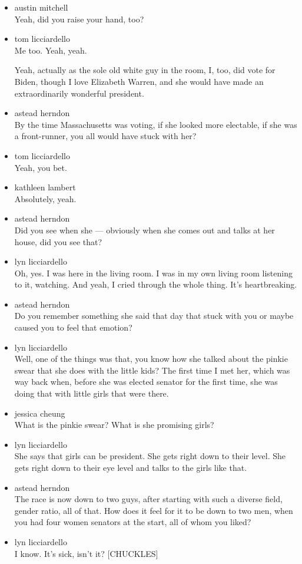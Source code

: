 \begin{itemize}
\item
  austin mitchell\\
  Yeah, did you raise your hand, too?
\item
  tom licciardello\\
  Me too. Yeah, yeah.

  Yeah, actually as the sole old white guy in the room, I, too, did vote
  for Biden, though I love Elizabeth Warren, and she would have made an
  extraordinarily wonderful president.
\item
  astead herndon\\
  By the time Massachusetts was voting, if she looked more electable, if
  she was a front-runner, you all would have stuck with her?
\item
  tom licciardello\\
  Yeah, you bet.
\item
  kathleen lambert\\
  Absolutely, yeah.
\item
  astead herndon\\
  Did you see when she --- obviously when she comes out and talks at her
  house, did you see that?
\item
  lyn licciardello\\
  Oh, yes. I was here in the living room. I was in my own living room
  listening to it, watching. And yeah, I cried through the whole thing.
  It's heartbreaking.
\item
  astead herndon\\
  Do you remember something she said that day that stuck with you or
  maybe caused you to feel that emotion?
\item
  lyn licciardello\\
  Well, one of the things was that, you know how she talked about the
  pinkie swear that she does with the little kids? The first time I met
  her, which was way back when, before she was elected senator for the
  first time, she was doing that with little girls that were there.
\item
  jessica cheung\\
  What is the pinkie swear? What is she promising girls?
\item
  lyn licciardello\\
  She says that girls can be president. She gets right down to their
  level. She gets right down to their eye level and talks to the girls
  like that.
\item
  astead herndon\\
  The race is now down to two guys, after starting with such a diverse
  field, gender ratio, all of that. How does it feel for it to be down
  to two men, when you had four women senators at the start, all of whom
  you liked?
\item
  lyn licciardello\\
  I know. It's sick, isn't it? {[}CHUCKLES{]}


\end{itemize}
